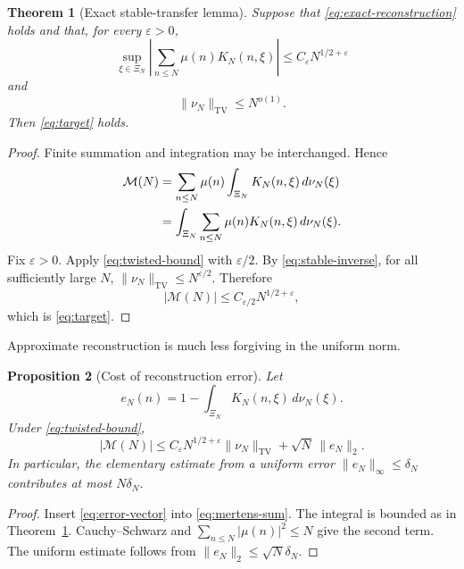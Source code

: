 \documentclass[11pt]{amsart}
\numberwithin{equation}{section}
\theoremstyle{plain}
\newtheorem{theorem}{Theorem}[section]
\newtheorem{proposition}[theorem]{Proposition}
\theoremstyle{definition}
\theoremstyle{remark}
\newcommand{\Mertens}{\mathcal M}
\newcommand{\TV}{\mathrm{TV}}
\newcommand{\eps}{\varepsilon}
\begin{document}
\begin{theorem}[Exact stable-transfer lemma]\label{thm:transfer}
Suppose that \eqref{eq:exact-reconstruction} holds and that, for every
\(\eps>0\),
\begin{equation}\label{eq:twisted-bound}
  \sup_{\xi\in\Xi_N}
  \left|\sum_{n\leq N}\mu(n)K_N(n,\xi)\right|
  \leq C_{\eps}N^{1/2+\eps}
\end{equation}
and
\begin{equation}\label{eq:stable-inverse}
  \|\nu_N\|_{\TV}\leq N^{o(1)}.
\end{equation}
Then \eqref{eq:target} holds.
\end{theorem}

\begin{proof}
Finite summation and integration may be interchanged.  Hence
\begin{align}
  \Mertens(N)
  &=\sum_{n\leq N}\mu(n)
    \int_{\Xi_N}K_N(n,\xi)\,d\nu_N(\xi)\notag\\
  &=\int_{\Xi_N}\sum_{n\leq N}\mu(n)K_N(n,\xi)
    \,d\nu_N(\xi).\label{eq:transfer-proof}
\end{align}
Fix \(\eps>0\).  Apply \eqref{eq:twisted-bound} with
\(\eps/2\).  By \eqref{eq:stable-inverse}, for all sufficiently large \(N\),
\(\|\nu_N\|_{\TV}\leq N^{\eps/2}\).  Therefore
\begin{equation}
 |\Mertens(N)|\leq C_{\eps/2}N^{1/2+\eps},
 \label{eq:transfer-final-bound}
\end{equation}
which is \eqref{eq:target}.
\end{proof}

Approximate reconstruction is much less forgiving in the uniform norm.

\begin{proposition}[Cost of reconstruction error]\label{prop:approximation}
Let
\begin{equation}\label{eq:error-vector}
  e_N(n)=1-\int_{\Xi_N}K_N(n,\xi)\,d\nu_N(\xi).
\end{equation}
Under \eqref{eq:twisted-bound},
\begin{equation}\label{eq:error-cost}
  |\Mertens(N)|
  \leq C_{\eps}N^{1/2+\eps}\|\nu_N\|_{\TV}
       +\sqrt N\,\|e_N\|_2.
\end{equation}
In particular, the elementary estimate from a uniform error
\(\|e_N\|_\infty\leq\delta_N\) contributes at most \(N\delta_N\).
\end{proposition}

\begin{proof}
Insert \eqref{eq:error-vector} into \eqref{eq:mertens-sum}.  The integral is
bounded as in Theorem~\ref{thm:transfer}.  Cauchy--Schwarz and
\(\sum_{n\leq N}|\mu(n)|^2\leq N\) give the second term.  The uniform estimate
follows from \(\|e_N\|_2\leq\sqrt N\delta_N\).
\end{proof}
\end{document}

